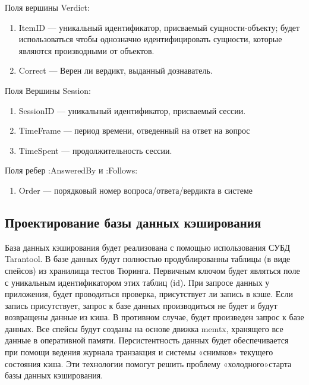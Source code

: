 Поля вершины Verdict:
\begin{enumerate}
    \item ItemID --- уникальный идентификатор, присваемый сущности-объекту; будет использоваться чтобы однозначно идентифицировать сущности, которые являются производными от объектов.
    \item Correct --- Верен ли вердикт, выданный дознаватель.
\end{enumerate}
Поля Вершины Session:
\begin{enumerate}
    \item SessionID --- уникальный идентификатор, присваемый сессии.
    \item TimeFrame --- период времени, отведенный на ответ на вопрос
    \item TimeSpent --- продолжительность сессии.
\end{enumerate}
Поля ребер :AnsweredBy и :Follows:
\begin{enumerate}
    \item Order --- порядковый номер вопроса/ответа/вердикта в системе
\end{enumerate}

\subsection{Проектирование базы данных кэширования}

База данных кэширования будет реализована с помощью использования СУБД Tarantool. 
В базе данных будут полностью продублированны таблицы (в виде спейсов) из хранилища тестов Тюринга. 
Первичным ключом будет являться поле с уникальным идентификатором этих таблиц (id). 
При запросе данных у приложения, будет проводиться проверка, присутствует ли запись в кэше. 
Если запись присутствует, запрос к базе данных производиться не будет и будут возвращены данные из кэша. 
В противном случае, будет произведен запрос к базе данных.
Все спейсы будут созданы на основе движка memtx, хранящего все данные в оперативной памяти. 
Персистентность данных будет обеспечивается при помощи ведения журнала транзакция и системы «снимков» текущего
состояния кэша. 
Эти технологии помогут решить проблему «холодного»старта базы данных кэширования.
